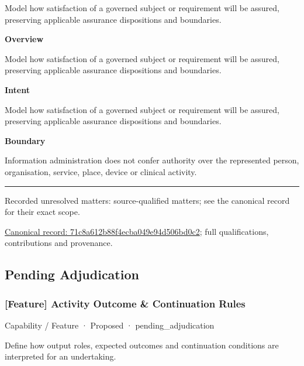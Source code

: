 Model how satisfaction of a governed subject or requirement will be assured, preserving applicable assurance dispositions and boundaries.



\textbf{Overview}



Model how satisfaction of a governed subject or requirement will be assured, preserving applicable assurance dispositions and boundaries.



\textbf{Intent}



Model how satisfaction of a governed subject or requirement will be assured, preserving applicable assurance dispositions and boundaries.



\textbf{Boundary}



Information administration does not confer authority over the represented person, organisation, service, place, device or clinical activity.



\medskip\hrule\medskip

{\small Recorded unresolved matters: source-qualified matters; see the canonical record for their exact scope.}\par
{\footnotesize \href{../../../../continuum/strategy/capability/71c8a612b88f4ecba049e94d506bd0c2.md}{Canonical record: 71c8a612b88f4ecba049e94d506bd0c2}; full qualifications, contributions and provenance.}\par
\subsection{Pending Adjudication}

\subsubsection{[Feature] Activity Outcome \& Continuation Rules}

\label{element:34c8309244c142ec8772dcbb11ecc4ef}
{\small Capability / Feature · Proposed · pending\_adjudication}\par

Define how output roles, expected outcomes and continuation conditions are interpreted for an undertaking.




